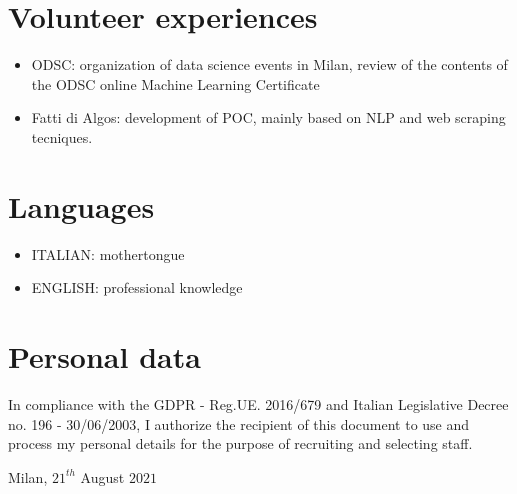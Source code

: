 \documentclass[11pt,a4paper,sans]{moderncv}        %
\begin{document}
\section{Volunteer experiences}
\begin{itemize}
 \item ODSC: organization of data science events in Milan, review of the contents of the ODSC online Machine Learning Certificate
 \item Fatti di Algos: development of POC, mainly based on NLP and web scraping tecniques. 
\end{itemize} 

\section{Languages}
\begin{itemize}
\item ITALIAN: mothertongue
\item ENGLISH: professional knowledge
\end{itemize} 

\section{Personal data}
In compliance with the GDPR - Reg.UE. 2016/679 and Italian Legislative Decree no. 196 - 30/06/2003, I authorize the recipient of this document to use and process my personal details for the purpose of recruiting and selecting staff. 

\bigskip
\bigskip
\bigskip
\bigskip
\bigskip
\bigskip
\bigskip
\bigskip
\bigskip
\bigskip
\bigskip
\bigskip
\bigskip
\bigskip
\bigskip
\bigskip
\bigskip
\bigskip
\bigskip
\bigskip
\bigskip
\bigskip
\bigskip
\bigskip
\bigskip
\bigskip
\bigskip
Milan, $21^{th}$ August $2021$
\end{document}
